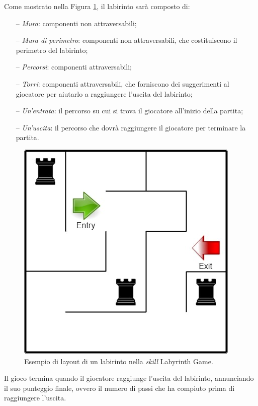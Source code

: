 Come mostrato nella Figura \ref{fig:figure4.6}, il labirinto sarà composto di:
\begin{itemize}
  \item[--] \textit{Mura}: componenti non attraversabili;
  \item[--] \textit{Mura di perimetro}: componenti non attraversabili, che
        costituiscono il perimetro del labirinto;
  \item[--] \textit{Percorsi}: componenti attraversabili;
  \item[--] \textit{Torri}: componenti attraversabili, che forniscono dei
        suggerimenti al giocatore per aiutarlo a raggiungere l’uscita del
        labirinto;
  \item[--] \textit{Un’entrata}: il percorso su cui si trova il giocatore
        all’inizio della partita;
  \item[--] \textit{Un’uscita}: il percorso che dovrà raggiungere il giocatore
        per terminare la partita.
\end{itemize}
\begin{figure}[!ht]
  \centering
  \includegraphics[scale=0.5]{resources/images/other/labyrinth-game-labyrinth-example.jpg}
  \caption{
    Esempio di layout di un labirinto nella \textit{skill} Labyrinth Game.
  }
  \label{fig:figure4.6}
\end{figure}

Il gioco termina quando il giocatore raggiunge l’uscita del labirinto,
annunciando il suo punteggio finale, ovvero il numero di passi che ha compiuto
prima di raggiungere l’uscita.

